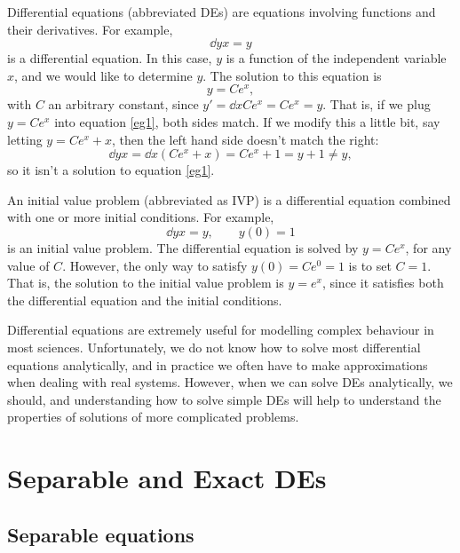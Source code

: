 \documentclass[12pt]{book}
\begin{document}
Differential equations (abbreviated DEs) are equations involving functions and
their derivatives. For example,
\begin{dmath}
  \label{eg1}
  \dd{y}{x} =y
\end{dmath}
is a differential equation. In this case, $y$ is a function of the independent
variable $x$, and we would like to determine $y$. The solution to this
equation is
\begin{dmath*}
  y = Ce^x,
\end{dmath*}
with $C$ an arbitrary constant, since $y'=\dd{}{x}Ce^x=Ce^x=y$. That is, if we
plug $y=Ce^x$ into equation \eqref{eg1}, both sides match. If we modify this
a little bit, say letting $y=Ce^x +x$, then the left hand side doesn't
match the right:
\begin{dmath*}
  \dd{y}{x} = \dd{}{x}(Ce^x +x) 
  = Ce^x + 1 = y +1 
  \neq y,
\end{dmath*}
so it isn't a solution to equation \eqref{eg1}.

An initial value problem (abbreviated as IVP) is a differential equation
combined with one or more initial conditions. For example,
\begin{dmath*}[compact]
  \dd{y}{x}=y, \qquad y(0)=1
\end{dmath*}
is an initial value problem.
The differential equation is solved by $y=Ce^x$, for any value of $C$. However,
the only way to satisfy $y(0)=Ce^0=1$ is to set $C=1$. That is, the solution
to the initial value problem is $y=e^x$, since it satisfies both the
differential equation and the initial conditions.

Differential equations are extremely useful for modelling complex behaviour in
most sciences. Unfortunately, we do not know how to solve most
differential equations analytically, and in practice we often have to
make approximations when dealing with real systems. However, when we can solve
DEs analytically, we should, and understanding how to solve simple DEs will
help to understand the properties of solutions of more complicated problems.



\chapter{Separable and Exact DEs}


\section{Separable equations}
\end{document}
